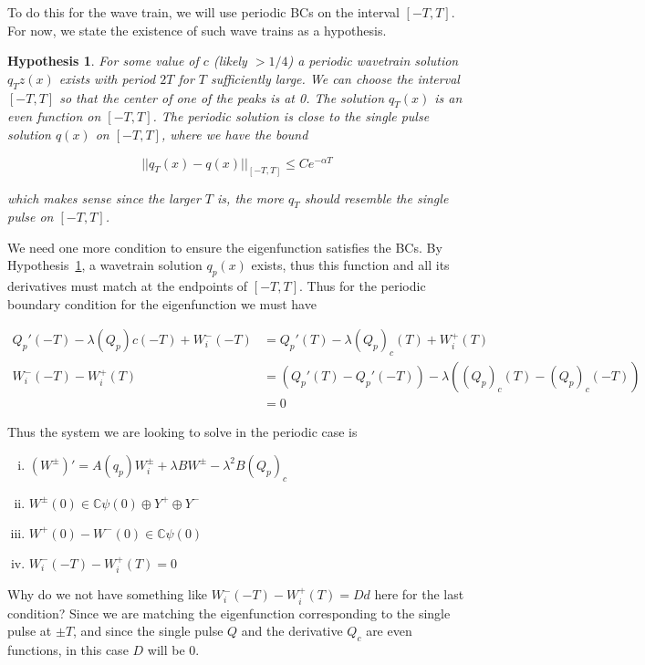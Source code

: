 \documentclass[12pt]{article}
\def\C{{\mathbb C}}
\newtheorem{hypothesis}{Hypothesis}
\begin{document}
To do this for the wave train, we will use periodic BCs on the interval $[-T, T]$. For now, we state the existence of such wave trains as a hypothesis.

\begin{hypothesis}\label{qpexists}
For some value of $c$ (likely $> 1/4$) a periodic wavetrain solution $q_Tz(x)$ exists with period $2T$ for $T$ sufficiently large. We can choose the interval $[-T,T]$ so that the center of one of the peaks is at 0. The solution $q_T(x)$ is an even function on $[-T, T]$. The periodic solution is close to the single pulse solution $q(x)$ on $[-T, T]$, where we have the bound 

\[
||q_T(x) - q(x)||_{[-T, T]} \leq C e^{-\alpha T}
\]

which makes sense since the larger $T$ is, the more $q_T$ should resemble the single pulse on $[-T, T]$.
\end{hypothesis}

We need one more condition to ensure the eigenfunction satisfies the BCs. By Hypothesis~\ref{qpexists}, a wavetrain solution $q_p(x)$ exists, thus this function and all its derivatives must match at the endpoints of $[-T, T]$.  Thus for the periodic boundary condition for the eigenfunction we must have

\begin{align*}
Q_p'(-T) - \lambda (Q_p)c(-T) + W_i^-(-T) &= Q_p'(T) - \lambda (Q_p)_c(T) + W_i^+(T) \\
W_i^-(-T) - W_i^+(T) &= ( Q_p'(T) - Q_p'(-T) ) - \lambda( (Q_p)_c(T) - (Q_p)_c(-T) ) \\
&= 0
\end{align*}

Thus the system we are looking to solve in the periodic case is

\begin{enumerate}[(i)]
\item $(W^\pm)' = A(q_p) W_i^\pm + \lambda B W^\pm - \lambda^2 B (Q_p)_c$
\item $W^\pm(0) \in \C \psi(0) \oplus Y^+ \oplus Y^-$
\item $W^+(0) - W^-(0) \in \C \psi(0) $
\item $W_i^-(-T) - W_i^+(T) = 0$
\end{enumerate}

Why do we not have something like $W_i^-(-T) - W_i^+(T) = D d$ here for the last condition? Since we are matching the eigenfunction corresponding to the single pulse at $\pm T$, and since the single pulse $Q$ and the derivative $Q_c$ are even functions, in this case $D$ will be 0.\\
\end{document}
